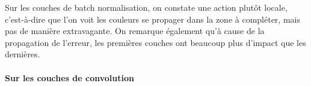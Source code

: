 \documentclass[12pt]{article}
\begin{document}
Sur les couches de batch normalisation, on constate une action plutôt locale, c'est-à-dire que l'on voit les couleurs se propager dans la zone à compléter, mais pas de manière extravagante. On remarque également qu'à cause de la propagation de l'erreur, les premières couches ont beaucoup plus d'impact que les dernières.

\newpage

\paragraph{Sur les couches de convolution}\ \\
\begin{figure}[htb]
\centering
  \hfill

\end{figure}
\end{document}
